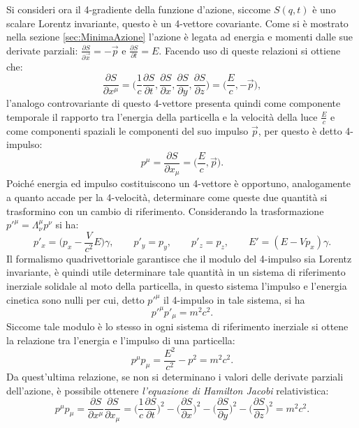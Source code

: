 Si consideri ora il 4-gradiente della funzione d'azione, siccome $S(q,t)$ è uno scalare Lorentz invariante, questo è un 4-vettore covariante. Come si è mostrato nella sezione \ref{sec:MinimaAzione} l'azione è legata ad energia e momenti dalle sue derivate parziali: $\frac{\partial S }{\partial \vec{x}}=-\vec{p}$ e $\frac{\partial S }{\partial t}=E$. Facendo uso di queste relazioni si ottiene che:
\begin{equation*}
    \frac{\partial S }{\partial x^\mu} =\bigg(\frac{1}{c}\frac{\partial S }{\partial t},\frac{\partial S }{\partial x},\frac{\partial S }{\partial y},\frac{\partial S }{\partial z}\bigg)=\bigg(\frac{E}{c},-\vec{p}\bigg),
\end{equation*}
l'analogo controvariante di questo 4-vettore presenta quindi come componente temporale il rapporto tra l'energia della particella e la velocità della luce $\frac{E}{c}$ e come componenti spaziali le componenti del suo impulso $\vec p$, per questo è detto 4-impulso:
\begin{equation}
    p^\mu=\frac{\partial S }{\partial x_\mu}=\bigg(\frac{E}{c},\vec{p}\bigg).
\end{equation}
Poiché energia ed impulso costituiscono un 4-vettore è opportuno, analogamente a quanto accade per la 4-velocità, determinare come queste due quantità si trasformino con un cambio di riferimento. Considerando la trasformazione $p'^\mu=\Lambda_\nu^\mu p^\nu$ si ha:
\begin{equation}
    p'_x=\bigg(p_x-\frac{V}{c^2}E\bigg)\gamma,\qquad p'_y=p_y,\qquad p'_z=p_z,\qquad E'=(E-Vp_x)\gamma.
\end{equation}
Il formalismo quadrivettoriale garantisce che il modulo del 4-impulso sia Lorentz invariante, è quindi utile determinare tale quantità in un sistema di riferimento inerziale solidale al moto della particella, in questo sistema l'impulso e l'energia cinetica sono nulli per cui, detto $p'^\mu$ il 4-impulso in tale sistema, si ha
\begin{equation*}
    p'^\mu p'_\mu=m^2c^2.
\end{equation*}  
Siccome tale modulo è lo stesso in ogni sistema di riferimento inerziale si ottene la relazione tra l'energia e l'impulso di una particella:
\begin{equation}
    p^\mu p_\mu=\frac{E^2}{c^2}-p^2=m^2c^2.
\end{equation}
Da quest'ultima relazione, se non si determinano i valori delle derivate parziali dell'azione, è possibile ottenere \emph{l'equazione di Hamilton Jacobi} relativistica:
\begin{equation}
    p^\mu p_\mu=\frac{\partial S }{\partial x^\mu}\frac{\partial S }{\partial x_\mu}=\bigg(\frac{1}{c}\frac{\partial S }{\partial t}\bigg)^2-\bigg(\frac{\partial S }{\partial x}\bigg)^2-\bigg(\frac{\partial S }{\partial y}\bigg)^2-\bigg(\frac{\partial S }{\partial z}\bigg)^2=m^2c^2.
\end{equation}